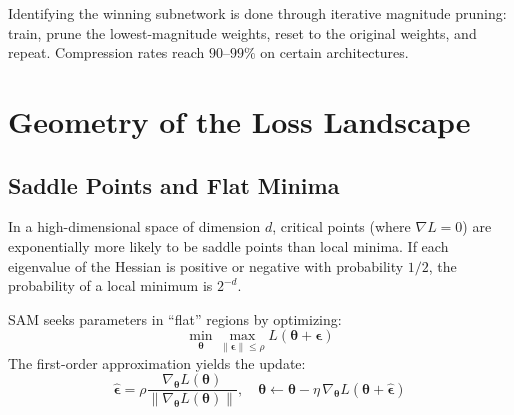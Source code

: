 \begin{remark}
Identifying the winning subnetwork is done through iterative magnitude
pruning: train, prune the lowest-magnitude weights,
reset to the original weights, and repeat.
Compression rates reach $90$--$99\%$ on certain architectures.
\end{remark}

\section{Geometry of the Loss Landscape}
\label{sec:loss-landscape}

\subsection{Saddle Points and Flat Minima}

\begin{proposition}
\label{prop:saddle-points}
In a high-dimensional space of dimension $d$, critical points
(where $\nabla L = 0$) are exponentially more likely to be
saddle points than local minima. If each eigenvalue of the
Hessian is positive or negative with probability $1/2$, the probability
of a local minimum is $2^{-d}$.
\end{proposition}

\begin{definition}
\label{def:sam}
SAM seeks parameters in ``flat'' regions by optimizing:
\begin{equation}
\min_{\boldsymbol{\theta}} \max_{\|\boldsymbol{\epsilon}\| \leq \rho} L(\boldsymbol{\theta} + \boldsymbol{\epsilon})
\end{equation}
The first-order approximation yields the update:
\begin{equation}
\hat{\boldsymbol{\epsilon}} = \rho \frac{\nabla_{\boldsymbol{\theta}} L(\boldsymbol{\theta})}{\|\nabla_{\boldsymbol{\theta}} L(\boldsymbol{\theta})\|}, \quad
\boldsymbol{\theta} \leftarrow \boldsymbol{\theta} - \eta\,\nabla_{\boldsymbol{\theta}} L(\boldsymbol{\theta} + \hat{\boldsymbol{\epsilon}})
\end{equation}
\end{definition}

